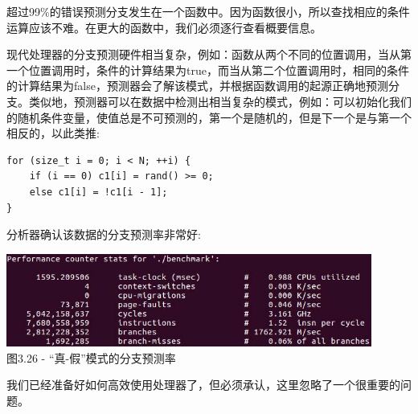 超过99\%的错误预测分支发生在一个函数中。因为函数很小，所以查找相应的条件运算应该不难。在更大的函数中，我们必须逐行查看概要信息。

现代处理器的分支预测硬件相当复杂，例如：函数从两个不同的位置调用，当从第一个位置调用时，条件的计算结果为true，而当从第二个位置调用时，相同的条件的计算结果为false，预测器会了解该模式，并根据函数调用的起源正确地预测分支。类似地，预测器可以在数据中检测出相当复杂的模式，例如：可以初始化我们的随机条件变量，使值总是不可预测的，第一个是随机的，但是下一个是与第一个相反的，以此类推:

\begin{lstlisting}[style=styleCXX]
for (size_t i = 0; i < N; ++i) {
	if (i == 0) c1[i] = rand() >= 0;
	else c1[i] = !c1[i - 1];
}
\end{lstlisting}

分析器确认该数据的分支预测率非常好:

\begin{center}
\includegraphics[width=0.9\textwidth]{content/1/chapter3/images/26.jpg}\\
图3.26 - “真-假”模式的分支预测率
\end{center}

我们已经准备好如何高效使用处理器了，但必须承认，这里忽略了一个很重要的问题。































